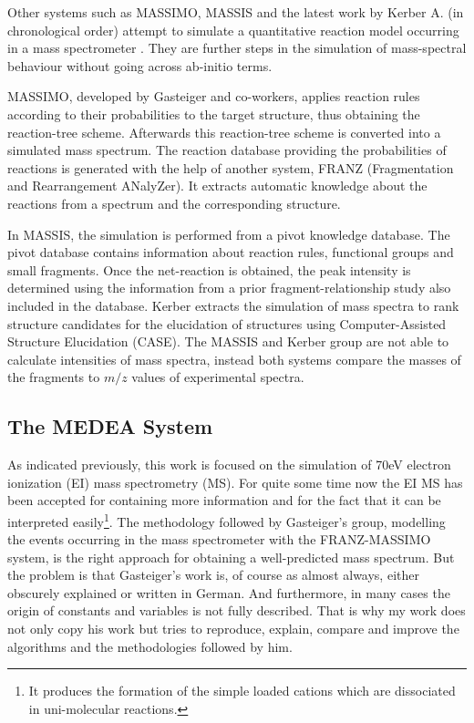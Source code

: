 \documentclass[10pt]{bmc_article}
\newenvironment{bmcformat}{\begin{raggedright}\baselineskip20pt\sloppy\setboolean{publ}{false}}{\end{raggedright}\baselineskip20pt\sloppy}
\begin{document}
\begin{bmcformat}
Other systems such as MASSIMO\cite{masssimo2003}, MASSIS\cite{massis2003a,massis2003b} and 
the latest work by Kerber A.\cite{kerber2006} (in chronological order) attempt to 
simulate a quantitative reaction model occurring  in a mass spectrometer . They 
are further steps in the simulation of mass-spectral behaviour without going 
across ab-initio terms.

MASSIMO, developed by Gasteiger and co-workers, applies reaction rules 
according to their probabilities to the target structure, thus obtaining the 
reaction-tree scheme. Afterwards this reaction-tree scheme is converted into a 
simulated mass spectrum. The reaction database providing the probabilities of 
reactions is generated with the help of another system, FRANZ (Fragmentation 
and Rearrangement ANalyZer). It extracts automatic knowledge about the 
reactions from a spectrum and the corresponding structure.

In MASSIS, the simulation is performed from a pivot knowledge database. The 
pivot database contains information about reaction rules, functional groups and 
small fragments. Once the net-reaction is obtained, the peak intensity is 
determined using the information from a prior fragment-relationship study also 
included in the database. Kerber extracts the simulation of mass spectra to 
rank structure candidates for the elucidation of structures using 
Computer-Assisted Structure Elucidation (CASE). The MASSIS and Kerber group are 
not able to calculate intensities of mass spectra, instead both systems compare 
the masses of the fragments to $m/z$ values of experimental spectra.


\subsection{The MEDEA System}

As indicated previously, this work is focused on the simulation of 70eV 
electron ionization (EI) mass spectrometry (MS). For quite some time now the EI 
MS has been accepted for containing more information and for the fact that it 
can be interpreted easily\footnote{It produces the formation of the simple 
loaded cations which are dissociated in uni-molecular reactions.}. The 
methodology followed by Gasteiger's group, modelling the events occurring in 
the mass spectrometer with the FRANZ-MASSIMO\cite{gasteiger1992} system, is the 
right approach for obtaining a well-predicted mass spectrum. But the problem is 
that Gasteiger's work is, of course as almost always, either obscurely 
explained or written in German. And furthermore, in many cases the origin of 
constants and variables is not fully described. That is why my work does not 
only copy his work but tries to reproduce, explain, compare and improve the 
algorithms and the methodologies followed by him.


\end{bmcformat}
\end{document}
